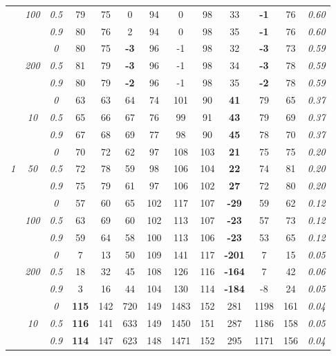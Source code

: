 \begin{table}
\begin{center}
\begin{tabular}{ccc|cc|cc|cc|cc|c|c}
 & \it  100  & \it  0.5  & 79 & 75 & 0 & 94 & 0 & 98 & 33 & {\bf -1} & 76 & \it  0.60 \\
& & \it  0.9  & 80 & 76 & 2 & 94 & 0 & 98 & 35 & {\bf -1} & 76 & \it  0.60 \\[1ex]
\cline{2-3}\rule{0pt}{3ex}
& & \it  0  & 80 & 75 & {\bf -3} & 96 & -1 & 98 & 32 & {\bf -3} & 73 & \it  0.59 \\
 & \it  200  & \it  0.5  & 81 & 79 & {\bf -3} & 96 & -1 & 98 & 34 & {\bf -3} & 78 & \it  0.59 \\
& & \it  0.9  & 80 & 79 & {\bf -2} & 96 & -1 & 98 & 35 & {\bf -2} & 78 & \it  0.59 \\
\hline\rule{0pt}{3ex}
& & \it  0  & 63 & 63 & 64 & 74 & 101 & 90 & {\bf 41} & 79 & 65 & \it  0.37 \\
 & \it  10  & \it  0.5  & 65 & 66 & 67 & 76 & 99 & 91 & {\bf 43} & 79 & 69 & \it  0.37 \\
& & \it  0.9  & 67 & 68 & 69 & 77 & 98 & 90 & {\bf 45} & 78 & 70 & \it  0.37 \\[1ex]
\cline{2-3}\rule{0pt}{3ex}
& & \it  0  & 70 & 72 & 62 & 97 & 108 & 103 & {\bf 21} & 75 & 75 & \it  0.20 \\
\it  1  & \it  50  & \it  0.5  & 72 & 78 & 59 & 98 & 106 & 104 & {\bf 22} & 74 & 81 & \it  0.20 \\
& & \it  0.9  & 75 & 79 & 61 & 97 & 106 & 102 & {\bf 27} & 72 & 80 & \it  0.20 \\[1ex]
\cline{2-3}\rule{0pt}{3ex}
& & \it  0  & 57 & 60 & 65 & 102 & 117 & 107 & {\bf -29} & 59 & 62 & \it  0.12 \\
 & \it  100  & \it  0.5  & 63 & 69 & 60 & 102 & 113 & 107 & {\bf -23} & 57 & 73 & \it  0.12 \\
& & \it  0.9  & 59 & 64 & 58 & 100 & 113 & 106 & {\bf -23} & 53 & 65 & \it  0.12 \\[1ex]
\cline{2-3}\rule{0pt}{3ex}
& & \it  0  & 7 & 13 & 50 & 109 & 141 & 117 & {\bf -201} & 7 & 15 & \it  0.05 \\
 & \it  200  & \it  0.5  & 18 & 32 & 45 & 108 & 126 & 116 & {\bf -164} & 7 & 42 & \it  0.06 \\
& & \it  0.9  & 3 & 16 & 44 & 104 & 130 & 114 & {\bf -184} & -8 & 24 & \it  0.05 \\
\hline\rule{0pt}{3ex}
& & \it  0  & {\bf 115} & 142 & 720 & 149 & 1483 & 152 & 281 & 1198 & 161 & \it  0.04 \\
 & \it  10  & \it  0.5  & {\bf 116} & 141 & 633 & 149 & 1450 & 151 & 287 & 1186 & 158 & \it  0.05 \\
& & \it  0.9  & {\bf 114} & 147 & 623 & 148 & 1471 & 152 & 295 & 1171 & 156 & \it  0.04 \\[1ex]

\end{tabular}
\end{center}
\end{table}
